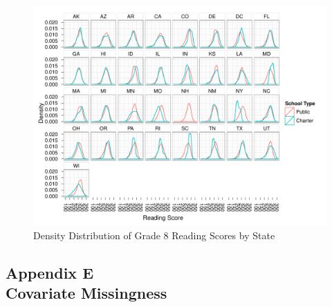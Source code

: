 \documentclass[letterpaper,12p,twoside]{article} %
\begin{document}
\begin{singlespace}
 \clearpage
 \clearpage
\begin{figure}[h]
\begin{center}
\includegraphics[height=\textwidth,angle=90]{../Figures/g8readingDensityByState.pdf}
\caption{Density Distribution of Grade 8 Reading Scores by State}
\label{fig:g8reading:density}
\end{center}
\end{figure}
\clearpage

\end{singlespace}

\cleardoublepage
{}
\subsection*{Appendix E\\Covariate Missingness}
\label{appendixmissing}
\end{document}
